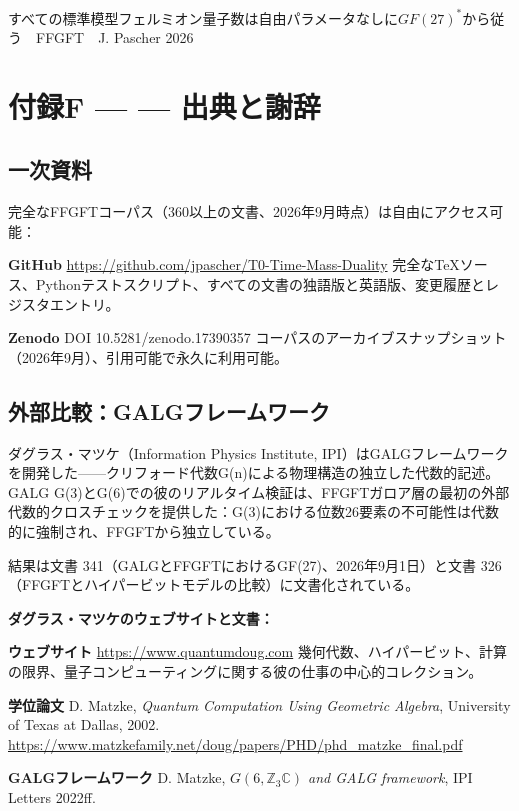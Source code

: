 \documentclass[11pt,openany]{book}
\begin{document}
すべての標準模型フェルミオン量子数は自由パラメータなしに$GF(27)^*$から従う　FFGFT　J. Pascher 2026

\medskip

\chapter*{付録F — — 出典と謝辞}

\section*{一次資料}

完全なFFGFTコーパス（360以上の文書、2026年9月時点）は自由にアクセス可能：

\textbf{GitHub} \url{https://github.com/jpascher/T0-Time-Mass-Duality}
完全なTeXソース、Pythonテストスクリプト、すべての文書の独語版と英語版、変更履歴とレジスタエントリ。

\textbf{Zenodo} DOI 10.5281/zenodo.17390357
コーパスのアーカイブスナップショット（2026年9月）、引用可能で永久に利用可能。

\section*{外部比較：GALGフレームワーク}

ダグラス・マツケ（Information Physics Institute, IPI）はGALGフレームワークを開発した——クリフォード代数G(n)による物理構造の独立した代数的記述。GALG G(3)とG(6)での彼のリアルタイム検証は、FFGFTガロア層の最初の外部代数的クロスチェックを提供した：G(3)における位数26要素の不可能性は代数的に強制され、FFGFTから独立している。

結果は文書 341（GALGとFFGFTにおけるGF(27)、2026年9月1日）と文書 326（FFGFTとハイパービットモデルの比較）に文書化されている。

\textbf{ダグラス・マツケのウェブサイトと文書：}

\textbf{ウェブサイト} \url{https://www.quantumdoug.com}
幾何代数、ハイパービット、計算の限界、量子コンピューティングに関する彼の仕事の中心的コレクション。

\textbf{学位論文} D. Matzke, \textit{Quantum Computation Using Geometric Algebra}, University of Texas at Dallas, 2002.
\url{https://www.matzkefamily.net/doug/papers/PHD/phd_matzke_final.pdf}

\textbf{GALGフレームワーク} D. Matzke, \textit{$G(6,\mathbb{Z}_3\mathbb{C})$ and GALG framework}, IPI Letters 2022ff.
\end{document}
